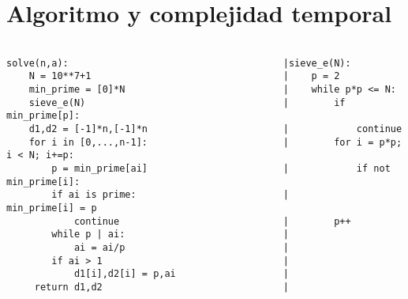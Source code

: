 \documentclass[12pt]{article}
\begin{document}
\newpage

\section{Algoritmo y complejidad temporal}


\begin{verbatim}

solve(n,a):                                      |sieve_e(N):
    N = 10**7+1                                  |    p = 2
    min_prime = [0]*N                            |    while p*p <= N:
    sieve_e(N)                                   |        if min_prime[p]:
    d1,d2 = [-1]*n,[-1]*n                        |            continue
    for i in [0,...,n-1]:                        |        for i = p*p; i < N; i+=p:
        p = min_prime[ai]                        |            if not min_prime[i]:        
        if ai is prime:                          |                min_prime[i] = p
            continue                             |        p++
        while p | ai:                            |
            ai = ai/p                            |
        if ai > 1                                |
            d1[i],d2[i] = p,ai                   |
     return d1,d2                                |
\end{verbatim}
\end{document}

